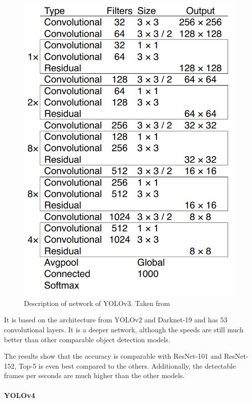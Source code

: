 \begin{figure}[htb!]
	\centering
	\includegraphics[scale=0.28]{figures/yolov3_architecture.png}
	\caption{Description of network of YOLOv3. Taken from \cite{yolov3}}
	\label{fig:yolov3_architecture}
\end{figure}

It is based on the architecture from YOLOv2 and Darknet-19 and has 53 convolutional layers. It is a deeper network, although the speeds are still much better than other comparable object detection models. 

The results show that the accuracy is comparable with ResNet-101 and ResNet-152, Top-5 is even best compared to the others. Additionally, the detectable frames per seconds are much higher than the other models.

\paragraph{YOLOv4}


